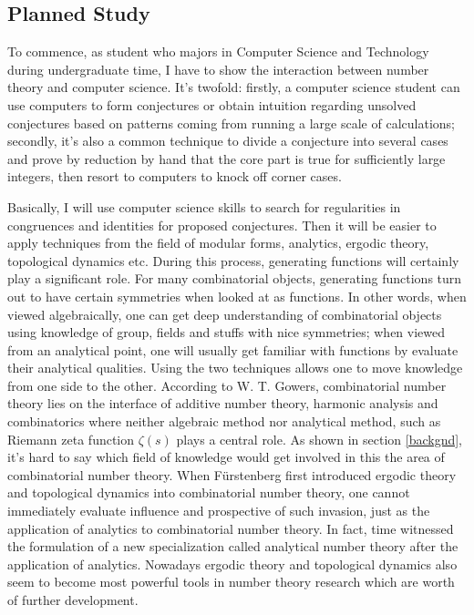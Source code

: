 \documentclass[12pt]{article}
\begin{document}
\bigskip

\subsection{Planned Study}

To commence, as student who majors in Computer Science and Technology during undergraduate time, I have to show the interaction between number theory and computer science. It's twofold: firstly, a computer science student can use computers to form conjectures or obtain intuition regarding unsolved conjectures based on patterns coming from running a large scale of calculations; secondly, it's also a common technique to divide a conjecture into several cases and prove by reduction by hand that the core part is true for sufficiently large integers, then resort to computers to knock off corner cases. 

Basically, I will use computer science skills to search for regularities in congruences and identities for proposed conjectures. Then it will be easier to apply techniques from the field of modular forms, analytics, ergodic theory, topological dynamics etc. During this process, generating functions will certainly play a significant role. For many combinatorial objects, generating functions turn out to have certain symmetries when looked at as functions. In other words, when viewed algebraically, one can get deep understanding of combinatorial objects using knowledge of group, fields and stuffs with nice symmetries; when viewed from an analytical point, one will usually get familiar with functions by evaluate their analytical qualities. Using the two techniques allows one to move knowledge from one side to the other. According to W. T. Gowers\cite{gowers}, combinatorial number theory lies on the interface of additive number theory, harmonic analysis and combinatorics where neither algebraic method nor analytical method, such as Riemann zeta function $\zeta(s)$ plays a central role. As shown in section \ref{backgnd}, it's hard to say which field of knowledge would get involved in this the area of combinatorial number theory. When F\"{u}rstenberg first introduced ergodic theory and topological dynamics into combinatorial number theory, one cannot immediately evaluate influence and prospective of such invasion, just as the application of analytics to combinatorial number theory. In fact, time witnessed the formulation of a new specialization called analytical number theory after the application of analytics. Nowadays ergodic theory and topological dynamics also seem to become most powerful tools in number theory research which are worth of further development.
\end{document}
